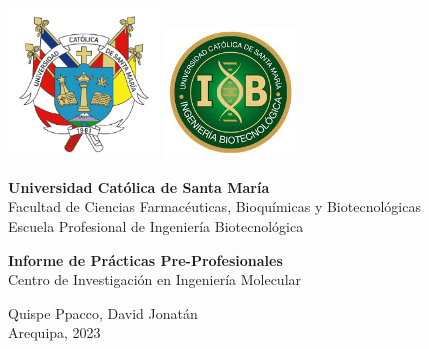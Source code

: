 \documentclass[a4paper,12pt]{article}
\begin{document}

\begin{titlepage}
    \begin{center}
      \includegraphics[width=4cm]{img/Sin título.png}\hfill
      \includegraphics[width=3.5cm]{img/images.jpeg}\par
      \vspace{3cm}
      \textbf{Universidad Católica de Santa María}\\
      Facultad de Ciencias Farmacéuticas, Bioquímicas y Biotecnológicas\\
      Escuela Profesional de Ingeniería Biotecnológica\par
      \vfill
      \textbf{Informe de Prácticas Pre-Profesionales}\\
      Centro de Investigación en Ingeniería Molecular\par
      \vfill
      Quispe Ppacco, David Jonatán\\
      Arequipa, 2023
    \end{center}

\end{titlepage}



\tableofcontents


\newpage
\end{document}
